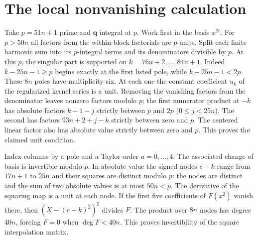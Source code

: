 \documentclass[11pt]{article}
\begin{document}
\section{The local nonvanishing calculation}
Take $p=51n+1$ prime and $\mathbf q$ integral at $p$. Work first in
the basis $x^{2i}$. For $p>50n$ all factors from the within-block
factorials are $p$-units. Split each finite harmonic sum into its
$p$-integral terms and its denominators divisible by $p$. At this $p$,
the singular part is supported on $k=76n+2,\ldots,84n+1$.
Indeed $k-25n-1\ge p$ begins exactly at the first listed pole, while
$k-25n-1<2p$. These $8n$ poles have multiplicity six. At each one
the constant coefficient $u_k$ of the regularized kernel series is a
unit. Removing the vanishing factors from the denominator leaves
nonzero factors modulo $p$; the first numerator product at $-k$ has
absolute factors $k-1-j$ strictly between $p$ and $2p$
($0\le j<25n$). The second has factors $93n+2+j-k$ strictly between
zero and $p$. The centered linear factor also has absolute value
strictly between zero and $p$. This proves the claimed unit condition.

Index columns by a pole and a Taylor order $a=0,\dots,4$. The associated
change of basis is invertible modulo $p$. In absolute value the signed
nodes $c-k$ range from $17n+1$ to $25n$ and their squares are distinct
modulo $p$: the nodes are distinct and the sum of two absolute values
is at most $50n<p$. The derivative of the squaring map is a unit at
each node. If the first five coefficients of $F(x^2)$ vanish there,
then $(X-(c-k)^2)^5$ divides $F$. The product over $8n$ nodes has degree
$40n$, forcing $F=0$ when $\deg F<40n$. This proves invertibility of
the square interpolation matrix.
\end{document}
